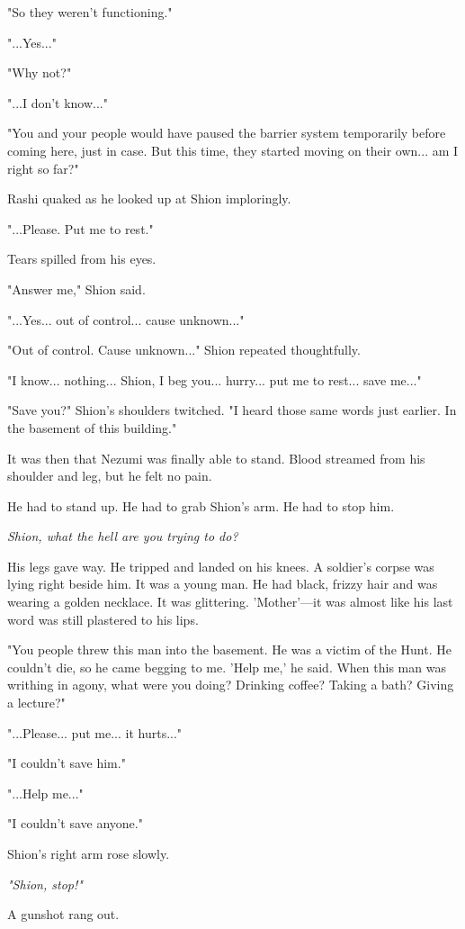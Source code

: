 "So they weren't functioning."

"...Yes..."

"Why not?"

"...I don't know..."

"You and your people would have paused the barrier system temporarily
before coming here, just in case. But this time, they started moving on
their own... am I right so far?"

Rashi quaked as he looked up at Shion imploringly.

"...Please. Put me to rest."

Tears spilled from his eyes.

"Answer me," Shion said.

"...Yes... out of control... cause unknown..."

"Out of control. Cause unknown..." Shion repeated thoughtfully.

"I know... nothing... Shion, I beg you... hurry... put me to rest...
save me..."

"Save you?" Shion's shoulders twitched. "I heard those same words just
earlier. In the basement of this building."

It was then that Nezumi was finally able to stand. Blood streamed from
his shoulder and leg, but he felt no pain.

He had to stand up. He had to grab Shion's arm. He had to stop him.

\emph{Shion, what the hell are you trying to do?}

His legs gave way. He tripped and landed on his knees. A soldier's
corpse was lying right beside him. It was a young man. He had black,
frizzy hair and was wearing a golden necklace. It was glittering.
'Mother'---it was almost like his last word was still plastered to his
lips.

"You people threw this man into the basement. He was a victim of the
Hunt. He couldn't die, so he came begging to me. 'Help me,' he said.
When this man was writhing in agony, what were you doing? Drinking
coffee? Taking a bath? Giving a lecture?"

"...Please... put me... it hurts..."

"I couldn't save him."

"...Help me..."

"I couldn't save anyone."

Shion's right arm rose slowly.

\emph{"Shion, stop!"}

A gunshot rang out.

